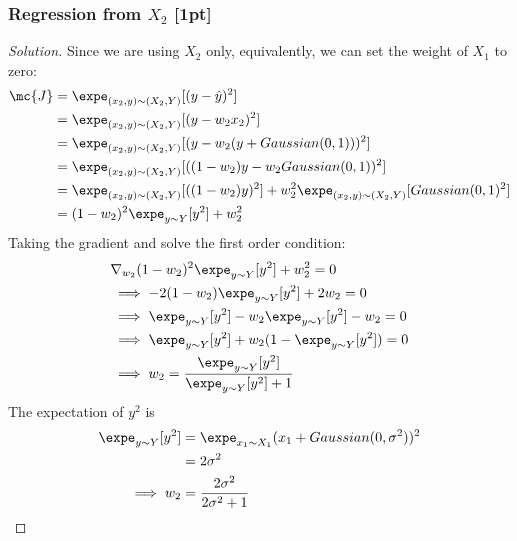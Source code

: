 \documentclass{article}
\begin{document}
	\subsubsection{Regression from $X_2$ [1pt]}
	\begin{proof}[Solution]
		Since we are using $X_2$ only, equivalently, we can set the weight of $X_1$ to zero:
		\begin{align}
			\mc{J} &= \expe_{(x_2, y) \sim (X_2, Y)} [(y - \hat{y})^2] \\
			&= \expe_{(x_2, y) \sim (X_2, Y)} [(y - w_2 x_2)^2] \\
			&= \expe_{(x_2, y) \sim (X_2, Y)} [(y - w_2 (y + Gaussian(0, 1)))^2] \\
			&= \expe_{(x_2, y) \sim (X_2, Y)} [((1 - w_2)y - w_2 Gaussian(0, 1) )^2] \\
			&= \expe_{(x_2, y) \sim (X_2, Y)} [((1 - w_2)y)^2] + w_2^2 \expe_{(x_2, y) \sim (X_2, Y)}[Gaussian(0, 1)^2] \\
			&= (1 - w_2)^2 \expe_{y \sim Y} [y^2] + w_2^2
		\end{align}
		Taking the gradient and solve the first order condition:
		\begin{align}
			&\nabla_{w_2} (1 - w_2)^2 \expe_{y \sim Y} [y^2] + w_2^2 = 0 \\
			&\implies - 2(1 - w_2) \expe_{y \sim Y} [y^2] + 2 w_2 = 0 \\
			&\implies \expe_{y \sim Y} [y^2] - w_2 \expe_{y \sim Y} [y^2] - w_2 = 0 \\
			&\implies \expe_{y \sim Y} [y^2] + w_2 (1- \expe_{y \sim Y} [y^2]) = 0 \\
			&\implies w_2 = \frac{\expe_{y \sim Y} [y^2]}{\expe_{y \sim Y} [y^2] + 1}
		\end{align}
		The expectation of $y^2$ is
		\begin{align}
			\expe_{y \sim Y} [y^2] &= \expe_{x_1 \sim X_1} (x_1 + Gaussian(0, \sigma^2))^2 \\
			&= 2 \sigma^2 \\
			\implies w_2 &= \frac{2 \sigma^2}{2 \sigma^2 + 1}
		\end{align}
	\end{proof}
	
\end{document}
